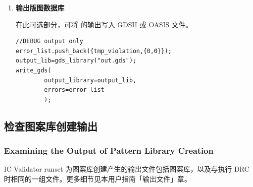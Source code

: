 \begin{enumerate}
\begin{itemize}
    生成以  环境变量命名的图案库目录，并保存在  环境变量定义的路径下。

     的错误输出存储为 \texttt{pattern\_learn result}。关于该错误输出的更多信息，见「检查图案库创建输出」。
  \end{itemize}

  \item \textbf{输出版图数据库}

  在此可选部分，可将  的输出写入 GDSII 或 OASIS 文件。
\begin{lstlisting}[style=pxl]
//DEBUG output only
error_list.push_back({tmp_violation,{0,0}});
output_lib=gds_library("out.gds");
write_gds(
        output_library=output_lib,
        errors=error_list
        );
\end{lstlisting}
\end{enumerate}

\subsection{检查图案库创建输出}
\subsubsection*{Examining the Output of Pattern Library Creation}

IC Validator runset 为图案库创建产生的输出文件包括图案库，以及与执行 DRC 时相同的一组文件。更多细节见本用户指南「输出文件」章。

